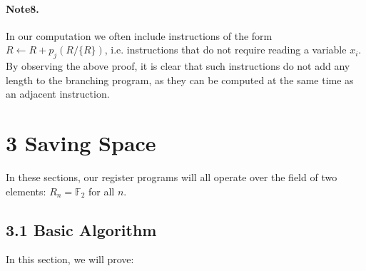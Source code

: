 \documentclass[10pt,a4paper]{article}
\begin{document}
\paragraph{Note8.} In our computation we often include instructions of the form $R\leftarrow R+p_j(R/\{R\})$, i.e. instructions that do not require reading a variable $x_i$. By observing the above proof, it is clear that such instructions do not add any length to the branching program, as they can be computed at the same time as an adjacent instruction.

\section*{3 Saving Space}
In these sections, our register programs will all operate over the field of two elements: $R_n=\mathbb F_2$ for all $n$.
\subsection*{3.1 Basic Algorithm}
In this section, we will prove:
\end{document}
